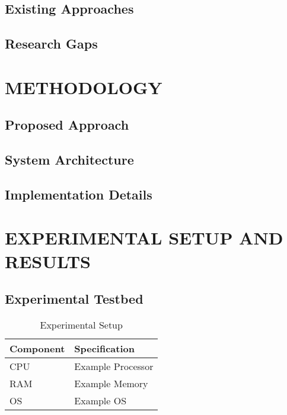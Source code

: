 \documentclass{SOICTthesis}  %
\begin{document}
\section{Existing Approaches}
\lipsum[16-18]
\cite{b6, b8}

\section{Research Gaps}
\lipsum[19-21]

\chapter{METHODOLOGY}
\section{Proposed Approach}
\lipsum[22-24]
\cite{b9}

\section{System Architecture}

\section{Implementation Details}
\lipsum[25-27]

\chapter{EXPERIMENTAL SETUP AND RESULTS}
\section{Experimental Testbed}
\lipsum[28-30]

\begin{table}[H]
\centering
\caption{Experimental Setup}
\begin{tabular}{|l|l|}
    \hline
    \textbf{Component} & \textbf{Specification} \\
    \hline
    CPU & Example Processor \\
    RAM & Example Memory \\
    OS  & Example OS \\
    \hline
\end{tabular}
\end{table}
\end{document}
